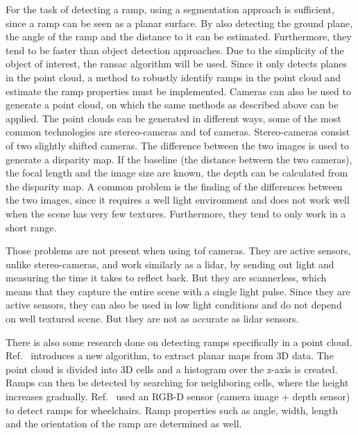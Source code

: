 For the task of detecting a ramp, using a segmentation approach is sufficient, since a ramp can be seen as a planar surface.
By also detecting the ground plane, the angle of the ramp and the distance to it can be estimated.
Furthermore, they tend to be faster than object detection approaches.
Due to the simplicity of the object of interest, the \gls{ransac} algorithm will be used.
Since it only detects planes in the point cloud, a method to robustly identify ramps in the point cloud and estimate the ramp properties must be implemented.
\bigbreak
Cameras can also be used to generate a point cloud, on which the same methods as described above can be applied.
The point clouds can be generated in different ways, some of the most common technologies are stereo-cameras and \gls{tof} cameras.
Stereo-cameras consist of two slightly shifted cameras.
The difference between the two images is used to generate a disparity map.
If the baseline (the distance between the two cameras), the focal length and the image size are known, the depth can be calculated from the disparity map.
A common problem is the finding of the differences between the two images, since it requires a well light environment and does not work well when the scene has very few textures.
Furthermore, they tend to only work in a short range.

Those problems are not present when using \gls{tof} cameras.
They are active sensors, unlike stereo-cameras, and work similarly as a \gls{lidar}, by sending out light and measuring the time it takes to reflect back.
But they are scannerless, which means that they capture the entire scene with a single light pulse.
Since they are active sensors, they can also be used in low light conditions and do not depend on well textured scene.
But they are not as accurate as \gls{lidar} sensors.

There is also some research done on detecting ramps specifically in a point cloud.
Ref.~\cite{Sakenas2007} introduces a new algorithm, to extract planar maps from 3D data.
The point cloud is divided into 3D cells and a histogram over the z-axis is created.
Ramps can then be detected by searching for neighboring cells, where the height increases gradually.
Ref.~\cite{Nejati2016} used an RGB-D sensor (camera image + depth sensor) to detect ramps for wheelchairs.
Ramp properties such as angle, width, length and the orientation of the ramp are determined as well.

